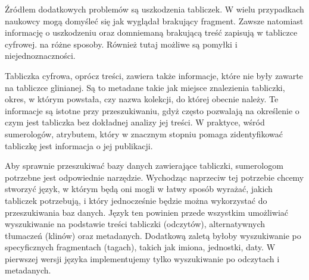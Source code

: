 Źródłem dodatkowych problemów są uszkodzenia tabliczek. W wielu przypadkach naukowcy mogą domyśleć się jak wyglądał brakujący fragment. Zawsze natomiast informację o uszkodzeniu oraz domniemaną brakującą treść zapisują w tabliczce cyfrowej.
 na różne sposoby. Również tutaj możliwe są pomyłki i niejednoznaczności.

Tabliczka cyfrowa, oprócz treści, zawiera także informacje, które nie były zawarte na tabliczce glinianej. Są to metadane takie jak miejsce znalezienia tabliczki, okres, w którym powstała, czy nazwa kolekcji, do której obecnie należy. Te informacje są istotne przy przeszukiwaniu, gdyż często pozwalają na określenie o czym jest tabliczka bez dokładnej analizy jej treści. W praktyce, wśród sumerologów, atrybutem, który w znacznym stopniu pomaga zidentyfikować tabliczkę jest informacja o jej publikacji.



Aby sprawnie przeszukiwać bazy danych zawierające tabliczki, sumerologom potrzebne jest odpowiednie narzędzie.
Wychodząc naprzeciw tej potrzebie chcemy stworzyć język, w którym będą oni mogli w łatwy sposób wyrażać, jakich tabliczek potrzebują, i który jednocześnie będzie można wykorzystać do przeszukiwania baz danych. Język ten powinien przede wszystkim umożliwiać wyszukiwanie na podstawie treści tabliczki (odczytów), alternatywnych tłumaczeń (klinów)
oraz metadanych.
Dodatkową zaletą byłoby wyszukiwanie po specyficznych fragmentach (tagach), takich jak imiona, jednostki, daty.
W pierwszej wersji języka implementujemy tylko wyszukiwanie po odczytach i metadanych.